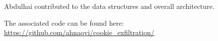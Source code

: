 \documentclass[sigplan,screen]{acmart}
\begin{document}
Abdulhai contributed to the data structures and overall architecture.

The associated code can be found here: 
\url{https://github.com/ahnaqvi/cookie_exfiltration/}

\newpage



\end{document}
